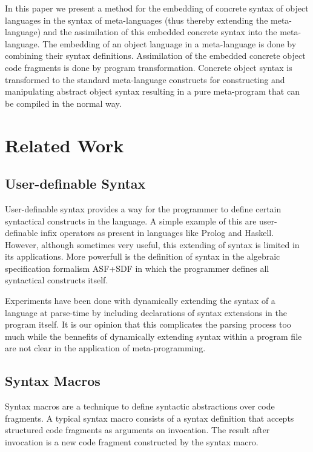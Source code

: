 \documentclass[a4paper,11pt]{article}
\begin{document}
In this paper we present a method for the embedding of concrete syntax of
object languages in the syntax of meta-languages (thus thereby extending the
meta-language) and the assimilation of this embedded concrete syntax into the
meta-language. The embedding of an object language in a meta-language is done
by combining their syntax definitions. Assimilation of the embedded concrete
object code fragments is done by program transformation. Concrete object
syntax is transformed to the standard meta-language constructs for
constructing and manipulating abstract object syntax resulting in a pure
meta-program that can be compiled in the normal way.


\section{Related Work}\label{sec:related}

\subsection{User-definable Syntax}

User-definable syntax provides a way for the programmer to define certain
syntactical constructs in the language. A simple example of this are
user-definable infix operators as present in languages like Prolog and
Haskell. However, although sometimes very useful, this extending of syntax
is limited in its applications. More powerfull is the definition of syntax
in the algebraic specification formalism ASF+SDF \cite{Berg89, Deur96} in which the programmer
defines all syntactical constructs itself.

Experiments have been done with dynamically extending the syntax of a
language at parse-time \cite{Weis93, Card94, Brab02} by including declarations of syntax extensions in
the program itself. It is our opinion that this complicates the parsing
process too much while the bennefits of dynamically extending syntax within
a program file are not clear in the application of meta-programming.


\subsection{Syntax Macros}

Syntax macros \cite{Leav66} are a technique to define syntactic abstractions over code
fragments. A typical syntax macro consists of a syntax definition that
accepts structured code fragments as arguments on invocation. The result
after invocation is a new code fragment constructed by the syntax macro.
\end{document}

